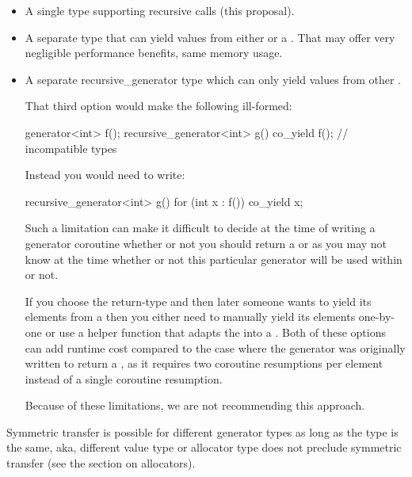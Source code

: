 \documentclass{wg21}
\begin{document}
\begin{itemize}
    \item A single  type supporting recursive calls (this proposal).

    \item A separate type  that can yield values from either  or a . That may offer very negligible performance benefits, same memory usage.

    \item A separate {recursive_generator} type which can only yield values from other .

    That third option would make the following ill-formed:

    \begin{colorblock}
        generator<int> f();
        recursive_generator<int> g() {
            co_yield f(); // incompatible types
        }
    \end{colorblock}

    Instead you would need to write:
    \begin{colorblock}
        recursive_generator<int> g() {
            for (int x : f()) co_yield x;
        }
    \end{colorblock}

    Such a limitation can make it difficult to decide at the time of writing a generator
    coroutine whether or not you should return a  or 
    as you may not know at the time whether or not this particular generator will be used
    within  or not.

    If you choose the  return-type and then later someone wants to yield its
    elements from a  then you either need to manually yield its
    elements one-by-one or use a helper function that adapts the  into a
    . Both of these options can add runtime cost compared to the case where the generator was originally written to return a ,
    as it requires two coroutine resumptions per element instead of a single coroutine resumption.

    Because of these limitations, we are not recommending this approach.
\end{itemize}

Symmetric transfer is possible for different generator types as long as the  type is the same, aka,
different value type or allocator type does not preclude symmetric transfer (see the section on allocators).
\end{document}
